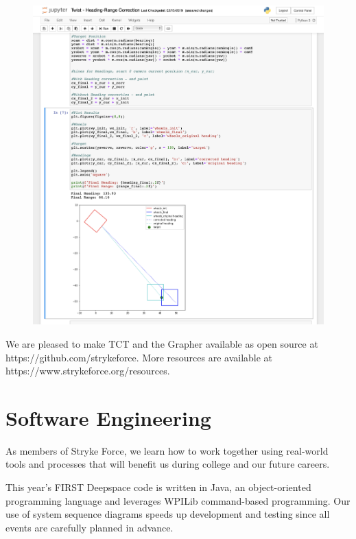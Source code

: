 \documentclass[10pt,tumble]{leaflet}
\begin{document}
\begin{figure}[H]
	\centering
	\includegraphics[scale=0.25]{assets/jupyter}
\end{figure}

\begin{figure}[H]
 \centering
\end{figure}

We are pleased to make TCT and the Grapher available as open source at https://github.com/strykeforce. More resources are available at https://www.strykeforce.org/resources.

\section{Software Engineering}

As members of Stryke Force, we learn how to work together using real-world tools and processes that will benefit us during college and our future careers.

This year’s FIRST Deepspace code is written in Java, an object-oriented programming language and leverages WPILib command-based programming. Our use of system sequence diagrams speeds up development and testing since all events are carefully planned in advance.
\end{document}
